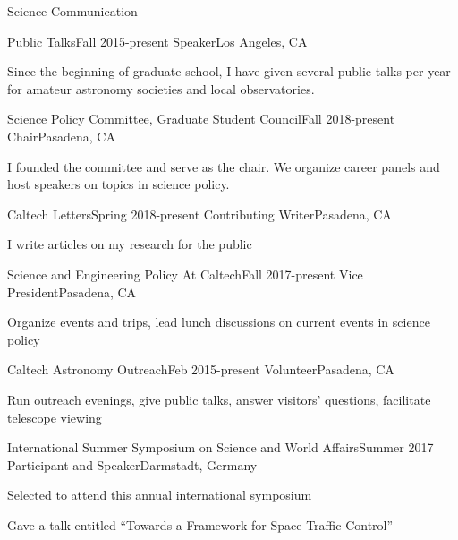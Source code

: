 \documentclass{resume} %
\begin{document}
\begin{rSection}{Science Communication}

  \begin{rSubsection}{Public Talks}{Fall 2015-present}
    {Speaker}{Los Angeles, CA}
  \item Since the beginning of graduate school, I have given several public talks
    per year for amateur astronomy societies and local observatories.
  \end{rSubsection}

  \begin{rSubsection}{Science Policy Committee, Graduate Student Council}{Fall 2018-present}
    {Chair}{Pasadena, CA}
  \item I founded the committee and serve as the chair. 
    We organize career panels and host speakers on topics in science policy.
  \end{rSubsection}

  \begin{rSubsection}{Caltech Letters}{Spring 2018-present}
    {Contributing Writer}{Pasadena, CA}
  \item I write articles on my research for the public
  \end{rSubsection}

  \begin{rSubsection}{Science and Engineering Policy At Caltech}{Fall 2017-present}
    {Vice President}{Pasadena, CA}
  \item Organize events and trips,
    lead lunch discussions on current events in science policy
  \end{rSubsection}

  \begin{rSubsection}{Caltech Astronomy Outreach}{Feb 2015-present}
    {Volunteer}{Pasadena, CA}
  \item Run outreach evenings, give public talks, answer visitors' questions, 
    facilitate telescope viewing
  \end{rSubsection}

  \begin{rSubsection}{International Summer Symposium on Science and World Affairs}{Summer 2017}
      {Participant and Speaker}{Darmstadt, Germany}
    \item Selected to attend this annual international symposium
    \item Gave a talk entitled ``Towards a Framework for Space Traffic Control''
  \end{rSubsection}


\end{rSection}
\end{document}

